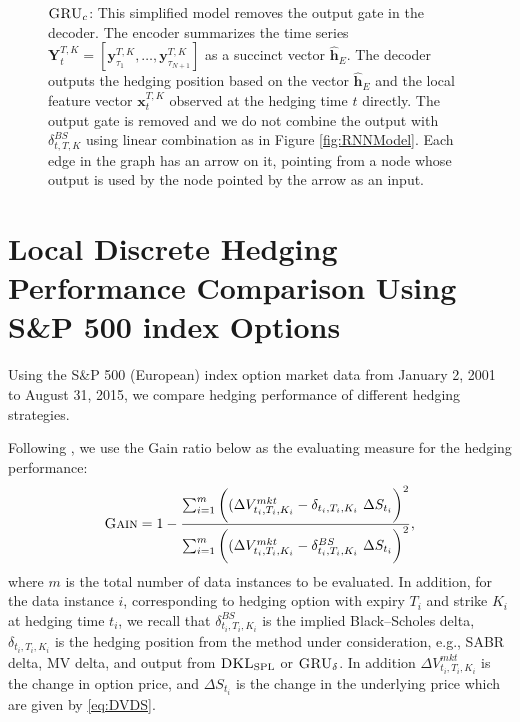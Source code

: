 \documentclass[letterpaper,12pt,titlepage,oneside,final]{book}
\numberwithin{equation}{section}
\theoremstyle{definition}
\newcommand{\model}{\textsc{GRU}_\delta}
\newcommand{\vx}{\mathbf{x}}
\newcommand{\vy}{\mathbf{y}}
\newcommand{\DKLs}{\bf\textsc{DKL}_{\text{SPL}}}
\begin{document}
\begin{figure}
{
	}\caption{$\textsc{GRU}_{c}$: This simplified model removes  the output gate in  the decoder. The encoder summarizes the time series $\mathbf{Y}_{t}^{T,K}=\left[\vy^{T,K}_{\tau_{1}},\dots,\vy^{T,K}_{\tau_{N+1}}\right]$ as a succinct  vector $\widehat{\mathbf{h}}_E$. The decoder outputs the hedging position based on the vector $\widehat{\mathbf{h}}_E$ and the local feature vector $\vx^{T,K}_{t}$ observed at the hedging time $t$ directly. The output gate is removed and we do not combine the output with $\delta^{BS}_{t,T,K}$ using linear combination as in Figure \ref{fig:RNNModel}.
	Each edge in the graph has an arrow on it, pointing from a node whose output is used by the node pointed by the arrow as an input.  }
	\label{fig:DRNNC}
	\end{figure}



\chapter{Local Discrete Hedging Performance Comparison Using  S\&P 500 index Options}
\label{sec:LocalComparison}
Using the S\&P 500  ({European})  index option market data from January 2, 2001 to August 31, 2015,
we  compare hedging performance of different hedging strategies.

Following \cite{hulloptimal},  we use the Gain ratio below as the evaluating measure for the hedging performance:
\[
\textsc{Gain}=1-\frac{\sum_{i=1}^m \bigg((\Delta V^{mkt}_{t_i,T_i,K_i}-\delta_{t_i,T_i,K_i} ~ \Delta S_{t_i} \bigg)^2}{\sum_{i=1}^m \bigg((\Delta V^{mkt}_{t_i,T_i,K_i}-\delta^{BS}_{t_i,T_i,K_i} ~ \Delta S_{t_i} \bigg)^2},
\]
where $m$ is the total number of data instances to be evaluated. In addition,  for the data instance $i$, corresponding to hedging option with expiry $T_i$ and strike $K_i$ at hedging time $t_i$, we recall that $\delta^{BS}_{t_i,T_i,K_i}$ is the implied Black–Scholes delta, $\delta_{t_i,T_i,K_i}$  is the hedging position from the method under consideration,  e.g., SABR delta,  MV delta,  and output from $\DKLs$ or $\model$.
  In addition $\Delta V^{mkt}_{t_i,T_i,K_i}$ is the change in option price, and $\Delta S_{t_i}$ is  the change in the underlying price which are given by \eqref{eq:DVDS}.
\end{document}
